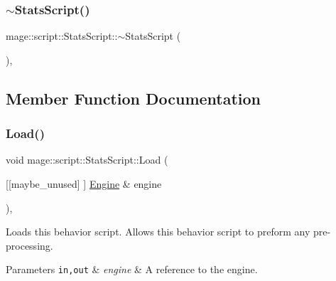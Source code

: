 \mbox{\label{classmage_1_1script_1_1_stats_script_a5b9b30aa6939968c2aee8cdf11f6486c}} 
\subsubsection{\texorpdfstring{$\sim$\+Stats\+Script()}{~StatsScript()}}
{\footnotesize\ttfamily mage\+::script\+::\+Stats\+Script\+::$\sim$\+Stats\+Script (\begin{DoxyParamCaption}{ }\end{DoxyParamCaption})\hspace{0.3cm}{\ttfamily [virtual]}, {\ttfamily [default]}}



\subsection{Member Function Documentation}
\mbox{\label{classmage_1_1script_1_1_stats_script_a4bfada754da5ca76591c5e7b9b0b1f51}} 
\subsubsection{\texorpdfstring{Load()}{Load()}}
{\footnotesize\ttfamily void mage\+::script\+::\+Stats\+Script\+::\+Load (\begin{DoxyParamCaption}\item[{\mbox{[}\mbox{[}maybe\+\_\+unused\mbox{]} \mbox{]} \mbox{\hyperlink{classmage_1_1_engine}{Engine}} \&}]{engine }\end{DoxyParamCaption})\hspace{0.3cm}{\ttfamily [override]}, {\ttfamily [virtual]}}

Loads this behavior script. Allows this behavior script to preform any pre-\/processing.


\begin{DoxyParams}[1]{Parameters}
\mbox{\tt in,out}  & {\em engine} & A reference to the engine. \\
\hline
\end{DoxyParams}

